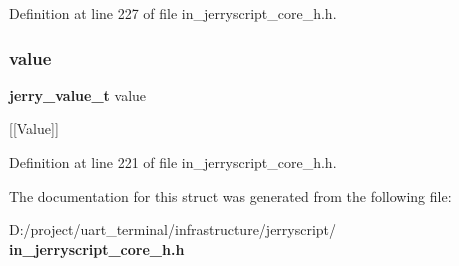 Definition at line 227 of file in\+\_\+jerryscript\+\_\+core\+\_\+h.\+h.

\mbox{\label{structjerry__property__descriptor__t_adb20673ad32e334c7e2cdc1449f1a100}} 
\subsubsection{value}
{\footnotesize\ttfamily \textbf{ jerry\+\_\+value\+\_\+t} value}

[[Value]] 

Definition at line 221 of file in\+\_\+jerryscript\+\_\+core\+\_\+h.\+h.



The documentation for this struct was generated from the following file\+:\begin{DoxyCompactItemize}
\item 
D\+:/project/uart\+\_\+terminal/infrastructure/jerryscript/\textbf{ in\+\_\+jerryscript\+\_\+core\+\_\+h.\+h}\end{DoxyCompactItemize}
